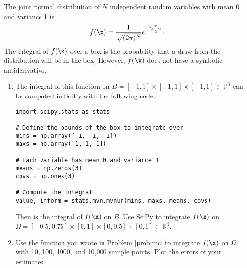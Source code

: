 \begin{comment}
\begin{problem}
The standard normal distribution is an important object of study in probability and statistic.
It is defined by the density function $\frac{1}{\sqrt{2 \pi}} e^{- \frac{x^2}{2}}$.
(Here we are assuming a mean of $0$ and a variance of $1$).
This is a function that cannot be integrated symbolically.
We can use monte carlo integration to estimate the probability that a normally distributed random variable will take a value below a given point.
The probability that the random variable we are considering is less than (or equal to) a given value $x$ is
\[\int_{-\infty}^x \frac{1}{\sqrt{2 \pi}} e^{- \frac{t^2}{2}} dt\]
This function is essentially zero for values of $x$ that lie reasonably far from the mean, so we can estimate this probability by integrating from $-5$ to $x$ instead.

Compare your result at $x = 1$ with the output of the code
\begin{lstlisting}
from scipy.stats import norm
N = norm()
N.cdf(1)
\end{lstlisting}
\end{problem}
\end{comment}

\begin{problem}
The joint normal distribution of $N$ independent random variables with mean 0 and variance 1 is
\[
f(\x) = \frac{1}{\sqrt{(2 \pi)^N}} e^{- \frac{\x^T\x}{2}}.
\]
The integral of $f(\x)$ over a box is the probability that a draw from the distribution will be in the box.
However, $f(\x)$ does not have a symbolic antiderivative.
\begin{enumerate}
\item The integral of this function on $B = [-1,1]\times [-1,1]\times[-1,1] \subset \mathbb{R}^3$ can be computed in SciPy with the following code.
\begin{lstlisting}
import scipy.stats as stats

# Define the bounds of the box to integrate over
mins = np.array([-1, -1, -1])
maxs = np.array([1, 1, 1])

# Each variable has mean 0 and variance 1
means = np.zeros(3)
covs = np.ones(3)

# Compute the integral
value, inform = stats.mvn.mvnun(mins, maxs, means, covs)
\end{lstlisting}
Then  is the integral of $f(\x)$ on $B$.
Use SciPy to integrate $f(\x)$ on $\Omega=[-0.5, 0.75]\times[0,1]\times[0, 0.5]\times[0,1] \subset \mathbb{R}^4$.

\item Use the function  you wrote in Problem \ref{prob:mc} to integrate $f(\x)$ on $\Omega$ with 10, 100, 1000, and 10,000 sample points. 
Plot the errors of your estimates.
\end{enumerate}
\end{problem}


